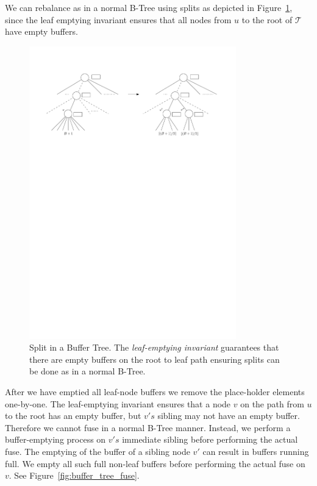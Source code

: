 \documentclass[twoside,11pt,openright]{report}
\begin{document}
We can rebalance as in a normal B-Tree using splits as depicted in Figure~\ref{fig:buffer_tree_split}, since the leaf emptying invariant ensures that all nodes from $u$ to the root of $\mathcal{T}$ have empty buffers.

\begin{figure}[H]
	\centering
	\includegraphics[width=0.8\textwidth]{../figures/buffer_tree_split}
	\caption{Split in a Buffer Tree. The \textit{leaf-emptying invariant} guarantees that there are empty buffers on the root to leaf path ensuring splits can be done as in a normal B-Tree.}
	\label{fig:buffer_tree_split}
\end{figure}

After we have emptied all leaf-node buffers we remove the place-holder elements one-by-one. The leaf-emptying invariant ensures that a node $v$ on the path from $u$ to the root has an empty buffer, but $v's$ sibling may not have an empty buffer. Therefore we cannot fuse in a normal B-Tree manner. Instead, we perform a buffer-emptying process on $v's$ immediate sibling before performing the actual fuse.
The emptying of the buffer of a sibling node $v'$ can result in buffers running full. We empty all such full non-leaf buffers before performing the actual fuse on $v$. See Figure~\ref{fig:buffer_tree_fuse}.
\end{document}
